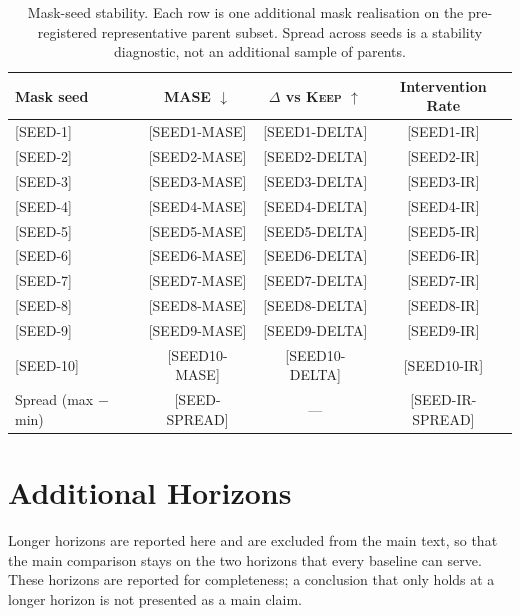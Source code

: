 \documentclass{article}
\newcommand{\ph}[1]{\textcolor{phgray}{\textsf{[#1]}}}
\begin{document}
\begin{table}[h]
  \caption{Mask-seed stability. Each row is one additional mask realisation on the
  pre-registered representative parent subset. Spread across seeds is a stability
  diagnostic, not an additional sample of parents.}
  \label{tab:app-seeds}
  \centering
  \small
  \setlength{\tabcolsep}{4pt}
  \begin{tabular}{lccc}
    \toprule
    Mask seed & MASE $\downarrow$ & $\Delta$ vs \textsc{Keep} $\uparrow$ & Intervention Rate \\
    \midrule
    \ph{SEED-1}  & \ph{SEED1-MASE}  & \ph{SEED1-DELTA}  & \ph{SEED1-IR} \\
    \ph{SEED-2}  & \ph{SEED2-MASE}  & \ph{SEED2-DELTA}  & \ph{SEED2-IR} \\
    \ph{SEED-3}  & \ph{SEED3-MASE}  & \ph{SEED3-DELTA}  & \ph{SEED3-IR} \\
    \ph{SEED-4}  & \ph{SEED4-MASE}  & \ph{SEED4-DELTA}  & \ph{SEED4-IR} \\
    \ph{SEED-5}  & \ph{SEED5-MASE}  & \ph{SEED5-DELTA}  & \ph{SEED5-IR} \\
    \ph{SEED-6}  & \ph{SEED6-MASE}  & \ph{SEED6-DELTA}  & \ph{SEED6-IR} \\
    \ph{SEED-7}  & \ph{SEED7-MASE}  & \ph{SEED7-DELTA}  & \ph{SEED7-IR} \\
    \ph{SEED-8}  & \ph{SEED8-MASE}  & \ph{SEED8-DELTA}  & \ph{SEED8-IR} \\
    \ph{SEED-9}  & \ph{SEED9-MASE}  & \ph{SEED9-DELTA}  & \ph{SEED9-IR} \\
    \ph{SEED-10} & \ph{SEED10-MASE} & \ph{SEED10-DELTA} & \ph{SEED10-IR} \\
    \midrule
    Spread (max $-$ min) & \ph{SEED-SPREAD} & --- & \ph{SEED-IR-SPREAD} \\
    \bottomrule
  \end{tabular}
\end{table}

\section{Additional Horizons}
\label{app:horizons}
Longer horizons are reported here and are excluded from the main text, so that the main
comparison stays on the two horizons that every baseline can serve. These horizons are
reported for completeness; a conclusion that only holds at a longer horizon is not
presented as a main claim.
\end{document}
